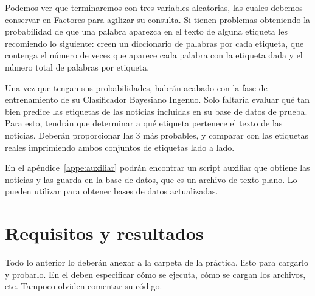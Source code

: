 Podemos ver que terminaremos con tres variables aleatorias, las cuales debemos conservar en Factores para agilizar su consulta. Si tienen problemas obteniendo la probabilidad de que una palabra aparezca en el texto de alguna etiqueta les recomiendo lo siguiente: creen un diccionario de palabras por cada etiqueta, que contenga el número de veces que aparece cada palabra con la etiqueta dada y el número total de palabras por etiqueta.

Una vez que tengan sus probabilidades, habrán acabado con la fase de entrenamiento de su Clasificador Bayesiano Ingenuo. Solo faltaría evaluar qué tan bien predice las etiquetas de las noticias incluidas en su base de datos de prueba. Para esto, tendrán que determinar a qué etiqueta pertenece el texto de las noticias. Deberán proporcionar las 3 más probables, y comparar con las etiquetas reales imprimiendo ambos conjuntos de etiquetas lado a lado.

En el apéndice~\ref{appe:auxiliar} podrán encontrar un script auxiliar que obtiene las noticias y las guarda en la base de datos, que es un archivo de texto plano. Lo pueden utilizar para obtener bases de datos actualizadas.

\section{Requisitos y resultados}

Todo lo anterior lo deberán anexar a la carpeta de la práctica, listo para cargarlo y probarlo. En el  deben especificar cómo se ejecuta, cómo se cargan los archivos, etc. Tampoco olviden comentar su código.
